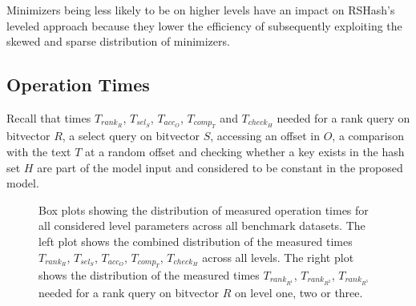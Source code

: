 \documentclass[a4paper,titlepage,onecolumn,oneside,12pt,nenglish,titlepage=firstiscover]{scrbook}
\theoremstyle{plain} %
\theoremstyle{definition} %
\theoremstyle{remark} %
\theoremstyle{plain}
\newcommand{\access}{acc}
\newcommand{\contains}{rank}
\newcommand{\select}{sel}
\newcommand{\compare}{comp}
\newcommand{\timeForOperationOnStructure}[2]{T_{#1_{#2}}} %
\begin{document}
Minimizers being less likely to be \infrequent on higher levels have an impact on RSHash's leveled approach because they lower the efficiency of subsequently exploiting the skewed and sparse distribution of minimizers.

\subsection{Operation Times} \label{subsec:observationsOperationTimes}
Recall that times 
$\timeForOperationOnStructure{\contains}{R}$,
$\timeForOperationOnStructure{\select}{S}$,
$\timeForOperationOnStructure{\access}{O}$,
$\timeForOperationOnStructure{\compare}{T}$ and
$\timeForOperationOnStructure{check}{H}$
needed for a rank query on bitvector $R$, a select query on bitvector $S$, accessing an offset in $O$, a comparison with the text $T$ at a random offset and checking whether a key exists in the hash set $H$ are part of the model input and considered to be constant in the proposed model.\\
\begin{figure}[h]
	\centering
	\begin{minipage}{0.48\textwidth}
		\centering
		\resizebox{\linewidth}{!}{%
			
		}
	\end{minipage}\hfill
	\begin{minipage}{0.48\textwidth}
		\centering
		\resizebox{\linewidth}{!}{%
			
		}
	\end{minipage}
	\caption{Box plots showing the distribution of measured operation times for all considered level parameters across all benchmark datasets.
		The left plot shows the combined distribution of the measured times 
		$\timeForOperationOnStructure{\contains}{R}$,
		$\timeForOperationOnStructure{\select}{S}$,
		$\timeForOperationOnStructure{\access}{O}$,
		$\timeForOperationOnStructure{\compare}{T}$,
		$\timeForOperationOnStructure{check}{H}$
		across all levels.
		The right plot shows the distribution of the measured times 
		$\timeForOperationOnStructure{\contains}{R^1}$,
		$\timeForOperationOnStructure{\contains}{R^2}$,
		$\timeForOperationOnStructure{\contains}{R^3}$
		needed for a rank query on bitvector $R$ on level one, two or three.}
	\label{fig:measureOperationTimes}
\end{figure}
\end{document}
